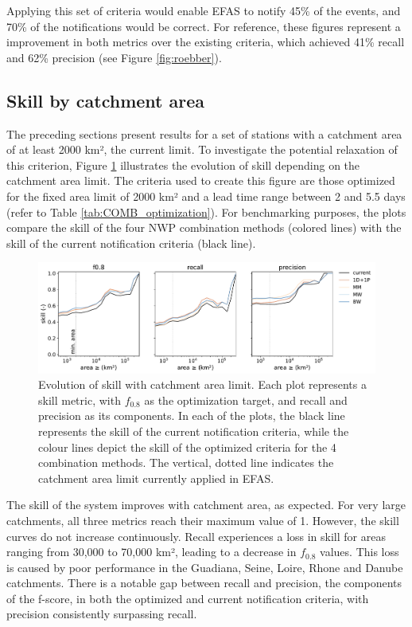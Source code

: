 \documentclass[preprint,12pt,authoryear]{elsarticle}
\begin{document}
Applying this set of criteria would enable EFAS to notify 45\% of the events, and 70\% of the notifications would be correct. For reference, these figures represent a improvement in both metrics over the existing criteria, which achieved 41\% recall and 62\% precision (see Figure \ref{fig:roebber}).

\subsection{Skill by catchment area}
\label{sec:skill_area}

The preceding sections present results for a set of stations with a catchment area of at least 2000 km², the current limit. To investigate the potential relaxation of this criterion, Figure \ref{fig:skill_area} illustrates the evolution of skill depending on the catchment area limit. The criteria used to create this figure are those optimized for the fixed area limit of 2000 km² and a lead time range between 2 and 5.5 days (refer to Table \ref{tab:COMB_optimization}). For benchmarking purposes, the plots compare the skill of the four NWP combination methods (colored lines) with the skill of the current notification criteria (black line).

\begin{figure}
    \centering
    \includegraphics[width=1\linewidth]{figures/skill_vs_area_2000km2_1239points_060h.pdf}
    \caption{Evolution of skill with catchment area limit. Each plot represents a skill metric, with $f_{0.8}$ as the optimization target, and recall and precision as its components. In each of the plots, the black line represents the skill of the current notification criteria, while the colour lines depict the skill of the optimized criteria for the 4 combination methods. The vertical, dotted line indicates the catchment area limit currently applied in EFAS.}
    \label{fig:skill_area}
\end{figure}

The skill of the system improves with catchment area, as expected. For very large catchments, all three metrics reach their maximum value of 1. However, the skill curves do not increase continuously. Recall experiences a loss in skill for areas ranging from 30,000 to 70,000 km², leading to a decrease in $f_{0.8}$ values. This loss is caused by poor performance in the Guadiana, Seine, Loire, Rhone and Danube catchments. There is a notable gap between recall and precision, the components of the f-score, in both the optimized and current notification criteria, with precision consistently surpassing recall. 
\end{document}
